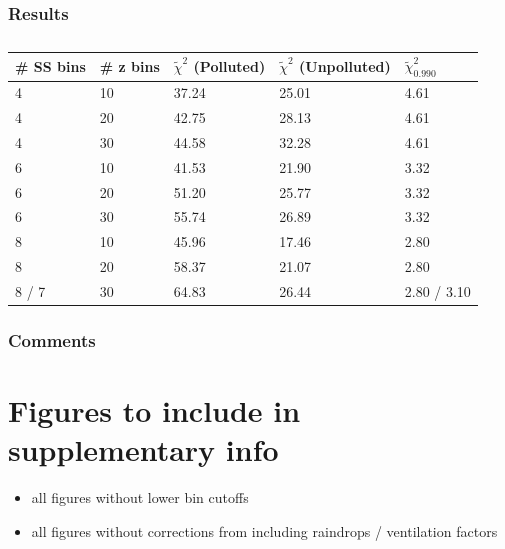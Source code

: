 \documentclass{article}
\begin{document}
\subsubsection{Results}
\begin{table}[]
\centering
\begin{tabular}{@{}lllll@{}}
\toprule
\textbf{\# SS bins} & \textbf{\# z bins} & \textbf{$\tilde\chi^2$ (Polluted)} & \textbf{$\tilde\chi^2$ (Unpolluted)} & \textbf{$\tilde\chi^2_{0.990}$} \\ \midrule
4 & 10 & 37.24 & 25.01 & 4.61 \\
4 & 20 & 42.75 & 28.13 & 4.61 \\
4 & 30 & 44.58 & 32.28 & 4.61 \\
6 & 10 & 41.53 & 21.90 & 3.32 \\
6 & 20 & 51.20 & 25.77 & 3.32 \\
6 & 30 & 55.74 & 26.89 & 3.32 \\
8 & 10 & 45.96 & 17.46 & 2.80 \\
8 & 20 & 58.37 & 21.07 & 2.80 \\
8 / 7 & 30 & 64.83 & 26.44 & 2.80 / 3.10 \\ \bottomrule
\end{tabular}
\caption{}
\label{tab:my-table}
\end{table}
\subsubsection{Comments}

\clearpage
\newpage

\section{Figures to include in supplementary info}
\begin{itemize}
	\item all figures without lower bin cutoffs
	\item all figures without corrections from including raindrops / ventilation factors
\end{itemize}
\end{document}
